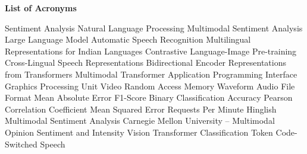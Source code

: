 \label{page:Acronyms}
\begin{center}
    \textbf{\Large List of Acronyms}
\end{center}

\begin{acronym}
              Sentiment Analysis \vspace*{0.5mm}
             Natural Language Processing \vspace*{0.5mm}
             Multimodal Sentiment Analysis \vspace*{0.5mm}
             Large Language Model \vspace*{0.5mm}
             Automatic Speech Recognition \vspace*{0.5mm}
           Multilingual Representations for Indian Languages \vspace*{0.5mm}
            Contrastive Language-Image Pre-training \vspace*{0.5mm}
            Cross-Lingual Speech Representations \vspace*{0.5mm}
            Bidirectional Encoder Representations from Transformers \vspace*{0.5mm}
            Multimodal Transformer \vspace*{0.5mm}
             Application Programming Interface \vspace*{0.5mm}
             Graphics Processing Unit \vspace*{0.5mm}
            Video Random Access Memory \vspace*{0.5mm}
             Waveform Audio File Format \vspace*{0.5mm}
             Mean Absolute Error \vspace*{0.5mm}
              F1-Score \vspace*{0.5mm}
           Binary Classification Accuracy \vspace*{0.5mm}
            Pearson Correlation Coefficient \vspace*{0.5mm}
             Mean Squared Error \vspace*{0.5mm}
             Requests Per Minute \vspace*{0.5mm}
     Hinglish Multimodal Sentiment Analysis \vspace*{0.5mm}
        Carnegie Mellon University -- Multimodal Opinion Sentiment and Intensity \vspace*{0.5mm}
             Vision Transformer \vspace*{0.5mm}
             Classification Token \vspace*{0.5mm}
             Code-Switched Speech \vspace*{0.5mm}
\end{acronym}
\newpage
